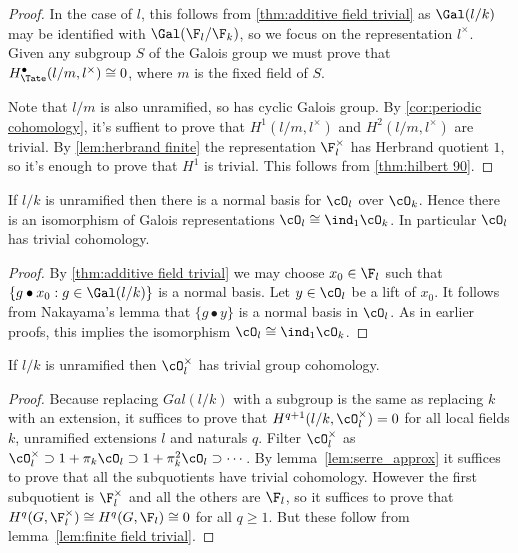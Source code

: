 \begin{proof}
	In the case of $l$, this follows from \ref{thm:additive field trivial} as $\Gal(l/k)$ may be
	identified with $\Gal(\F_l / \F_k)$, so we focus on the
	representation $l^\times$. Given any subgroup $S$ of the Galois group we must prove that
	$H^\bullet_{\Tate}(l/m,l^\times) \cong 0$, where $m$ is the fixed field of $S$.

	Note that $l/m$ is also unramified, so has cyclic Galois group.
	By \ref{cor:periodic cohomology},
	it's suffient to prove that $H^1(l/m,l^\times)$ and $H^2(l/m,l^\times)$ are trivial.
	By \ref{lem:herbrand finite} the representation $\F_l^\times$ has Herbrand quotient $1$,
	so it's enough to prove that $H^1$ is trivial.
	This follows from \ref{thm:hilbert 90}.
\end{proof}


\begin{lemma} \label{lem:unramified additive trivial}
	If $l/k$ is unramified then there is a normal basis for $\cO_l$ over $\cO_k$.
	Hence there is an isomorphism of Galois representations $\cO_l \cong \ind_1 \cO_k$.
	In particular $\cO_l$ has trivial cohomology.
\end{lemma}

\begin{proof}
	By \ref{thm:additive field trivial}
	we may choose $x_0 \in \F_l$
	such that $\{g \bullet x_0 :g \in \Gal(l/k)\}$ is a normal basis.
	Let $y \in \cO_l$ be a lift of $x_0$.
	It follows from Nakayama's lemma that $\{g \bullet y\}$ is a normal basis	in $\cO_l$.
	As in earlier proofs, this implies the isomorphism $\cO_l \cong \ind_1 \cO_k$.
\end{proof}




\begin{lemma}	\label{lem:unramified units trivial}
	If $l/k$ is unramified then $\cO_l^\times$ has trivial group cohomology.
\end{lemma}

\begin{proof}
	Because replacing $Gal(l/k)$ with a subgroup is the same as replacing $k$ with an extension,
	it suffices to prove that $H^{q+1}(l/k,\cO_l^\times)=0$ for all local fields $k$,
	unramified extensions $l$ and naturals $q$. Filter $\cO_l^\times$ as
	$\cO_l^\times\supset 1+\pi_k\cO_l\supset 1+\pi_k^2\cO_l\supset\cdots$.
	By lemma~\ref{lem:serre_approx} it suffices to prove that all the subquotients have
	trivial cohomology. However the first subquotient is $\F_l^\times$ and all the others
	are $\F_l$, so it suffices to prove that $H^q(G,\F_l^\times)\cong H^q(G,\F_l)\cong 0$
	for all $q\geq1$.
	But these follow from lemma~\ref{lem:finite field trivial}.
\end{proof}


